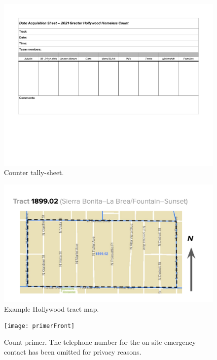 \documentclass[11pt,twocolumn]{article}
\begin{document}
\begin{figure}[t]
	\centering
	\includegraphics[width =\linewidth, trim = 2cm 6cm 2cm 0cm]{Hollywood2021CountDataSheet}
	\caption{Counter tally-sheet.}
	\label{fig:tallySheet}
\end{figure}

\begin{figure}
	\centering
	\includegraphics[width =\linewidth, trim = 2cm 0cm 2cm 0cm]{tractMap}
	\caption{Example Hollywood tract map.}
	\label{fig:tractMap}
\end{figure}

\begin{figure}[t!]
	\centering
	\texttt{[image: primerFront]}
	\caption{Count primer. The telephone number for the on-site emergency contact has been omitted for 
			privacy reasons.}
	\label{fig:primer}
\end{figure}
\end{document}
